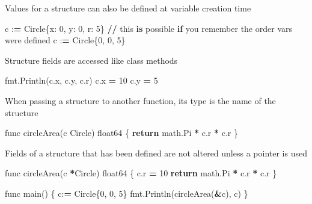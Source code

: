 \documentclass[]{book}
\newenvironment{Shaded}{\begin{snugshade}}{\end{snugshade}}
\newcommand{\KeywordTok}[1]{\textcolor[rgb]{0.13,0.29,0.53}{\textbf{#1}}}
\newcommand{\DecValTok}[1]{\textcolor[rgb]{0.00,0.00,0.81}{#1}}
\newcommand{\ControlFlowTok}[1]{\textcolor[rgb]{0.13,0.29,0.53}{\textbf{#1}}}
\newcommand{\OperatorTok}[1]{\textcolor[rgb]{0.81,0.36,0.00}{\textbf{#1}}}
\newcommand{\BuiltInTok}[1]{#1}
\newcommand{\NormalTok}[1]{#1}
\begin{document}
Values for a structure can also be defined at variable creation time

\begin{Shaded}
\begin{Highlighting}[]
\NormalTok{c :}\OperatorTok{=}\NormalTok{ Circle\{x: }\DecValTok{0}\NormalTok{, y: }\DecValTok{0}\NormalTok{, r: }\DecValTok{5}\NormalTok{\}}
\OperatorTok{//}\NormalTok{ this }\KeywordTok{is}\NormalTok{ possible }\ControlFlowTok{if}\NormalTok{ you remember the order }\BuiltInTok{vars}\NormalTok{ were defined}
\NormalTok{c :}\OperatorTok{=}\NormalTok{ Circle\{}\DecValTok{0}\NormalTok{, }\DecValTok{0}\NormalTok{, }\DecValTok{5}\NormalTok{\}}
\end{Highlighting}
\end{Shaded}

Structure fields are accessed like class methods

\begin{Shaded}
\begin{Highlighting}[]
\NormalTok{fmt.Println(c.x, c.y, c.r)}
\NormalTok{c.x }\OperatorTok{=} \DecValTok{10}
\NormalTok{c.y }\OperatorTok{=} \DecValTok{5}
\end{Highlighting}
\end{Shaded}

When passing a structure to another function, its type is the name of
the structure

\begin{Shaded}
\begin{Highlighting}[]
\NormalTok{func circleArea(c Circle) float64 \{}
    \ControlFlowTok{return}\NormalTok{ math.Pi }\OperatorTok{*}\NormalTok{ c.r }\OperatorTok{*}\NormalTok{ c.r     }
\NormalTok{\}                                  }
\end{Highlighting}
\end{Shaded}

Fields of a structure that has been defined are not altered unless a
pointer is used

\begin{Shaded}
\begin{Highlighting}[]
\NormalTok{func circleArea(c }\OperatorTok{*}\NormalTok{Circle) float64 \{}
\NormalTok{    c.r }\OperatorTok{=} \DecValTok{10}                        
    \ControlFlowTok{return}\NormalTok{ math.Pi }\OperatorTok{*}\NormalTok{ c.r }\OperatorTok{*}\NormalTok{ c.r      }
\NormalTok{\}                                   }
                                    
\NormalTok{func main() \{                       }
\NormalTok{    c:}\OperatorTok{=}\NormalTok{ Circle\{}\DecValTok{0}\NormalTok{, }\DecValTok{0}\NormalTok{, }\DecValTok{5}\NormalTok{\}             }
\NormalTok{    fmt.Println(circleArea(}\OperatorTok{&}\NormalTok{c), c)  }
\NormalTok{\}}
\end{Highlighting}
\end{Shaded}
\end{document}
